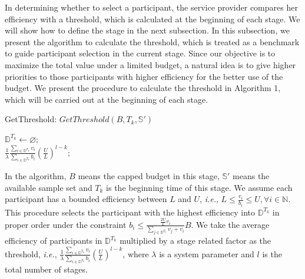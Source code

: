 \documentclass[10pt,journal,letterpaper,compsoc]{IEEEtran}
\newcommand{\ie}{{\em i.e.}}
\begin{document}
In determining whether to select a participant, the service provider compares her efficiency with a threshold, which is calculated at the beginning of each stage. We will show how to define the stage in the next subsection. In this subsection, we present the algorithm to calculate the threshold, which is treated as a benchmark to guide participant selection in the current stage. Since our objective is to maximize the total value under a limited budget, a natural idea is to give higher priorities to those participants with higher efficiency for the better use of the budget. We present the procedure to calculate the threshold in Algorithm 1, which will be carried out at the beginning of each stage.

\begin{algorithm}
\BlankLine
{}
\caption{GetThreshold: $GetThreshold(B, {T_k}, \mathbb{S}')$}
\label{alg:GetThreshold}
\begin{small}
\BlankLine
$\mathbb{D}^{T_k}\leftarrow\varnothing$;\\
\Return $\frac{1}{\lambda}\frac{\sum_{i\in\mathbb{D}^{T_k}}v_i}{\sum_{i\in\mathbb{D}^{T_k}}b_i}\left(\frac{U}{L}\right)^{l-k};$
\end{small}
\end{algorithm}

In the algorithm, $B$ means the capped budget in this stage, $\mathbb{S}'$ means the available sample set and $T_k$ is the beginning time of this stage. We assume each participant has a bounded efficiency between $L$ and $U$, \ie, $L \le \frac{v_i}{b_i} \le U, \forall i \in \mathbb{N}$. This procedure selects the participant with the highest efficiency into $\mathbb{D}^{T_k}$ in proper order under the constraint $b_i \le \frac{\frac{2U}{L}v_i}{\sum\limits_{j \in\mathbb{D}^{T_k}}v_j+v_i}B$. We take the average efficiency of participants in $\mathbb{D}^{T_k}$ multiplied by a stage related factor as the threshold, \ie, $\frac{1}{\lambda}\frac{\sum_{i\in\mathbb{D}^{T_k}}v_i}{\sum_{i\in\mathbb{D}^{T_k}}b_i}\left(\frac{U}{L}\right)^{l-k}$, where $\lambda$ is a system parameter and $l$ is the total number of stages.
\end{document}
